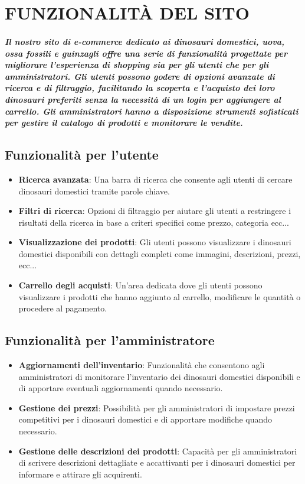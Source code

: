 \chapter{FUNZIONALITÀ DEL SITO}
\paragraph{Il nostro sito di e-commerce dedicato ai dinosauri domestici, uova, ossa fossili e guinzagli offre una serie di funzionalità progettate per migliorare l'esperienza di shopping sia per gli utenti che per gli amministratori. Gli utenti possono godere di opzioni avanzate di ricerca e di filtraggio, facilitando la scoperta e l'acquisto dei loro dinosauri preferiti senza la necessità di un login per aggiungere al carrello. Gli amministratori hanno a disposizione strumenti sofisticati per gestire il catalogo di prodotti e monitorare le vendite.}

\section{Funzionalità per l'utente}
\begin{itemize}
    \item \textbf{Ricerca avanzata}: Una barra di ricerca che consente agli utenti di cercare dinosauri domestici tramite parole chiave.
    \item \textbf{Filtri di ricerca}: Opzioni di filtraggio per aiutare gli utenti a restringere i risultati della ricerca in base a criteri specifici come prezzo, categoria ecc...
    \item \textbf{Visualizzazione dei prodotti}: Gli utenti possono visualizzare i dinosauri domestici disponibili con dettagli completi come immagini, descrizioni, prezzi, ecc...
    \item \textbf{Carrello degli acquisti}: Un'area dedicata dove gli utenti possono visualizzare i prodotti che hanno aggiunto al carrello, modificare le quantità o procedere al pagamento.
\end{itemize}

\section{Funzionalità per l'amministratore}
\begin{itemize}
    \item \textbf{Aggiornamenti dell'inventario}: Funzionalità che consentono agli amministratori di monitorare l'inventario dei dinosauri domestici disponibili e di apportare eventuali aggiornamenti quando necessario.
    \item \textbf{Gestione dei prezzi}: Possibilità per gli amministratori di impostare prezzi competitivi per i dinosauri domestici e di apportare modifiche quando necessario.
    \item \textbf{Gestione delle descrizioni dei prodotti}: Capacità per gli amministratori di scrivere descrizioni dettagliate e accattivanti per i dinosauri domestici per informare e attirare gli acquirenti.
\end{itemize}

